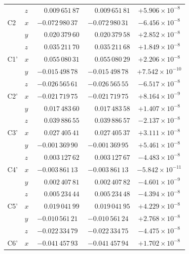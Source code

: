 \begin{longtable}{llccc}
      & $z$ & $\phantom{-}0.009\,651\,87$ & $\phantom{-}0.009\,651\,81$ & $+5.906 \times 10^{-8}$ \\[2pt]
  C2  & $x$ & $-0.072\,980\,37$ & $-0.072\,980\,31$ & $-6.456 \times 10^{-8}$ \\
      & $y$ & $\phantom{-}0.020\,379\,60$ & $\phantom{-}0.020\,379\,58$ & $+2.852 \times 10^{-8}$ \\
      & $z$ & $\phantom{-}0.035\,211\,70$ & $\phantom{-}0.035\,211\,68$ & $+1.849 \times 10^{-8}$ \\[2pt]
  C1' & $x$ & $\phantom{-}0.055\,080\,31$ & $\phantom{-}0.055\,080\,29$ & $+2.206 \times 10^{-8}$ \\
      & $y$ & $-0.015\,498\,78$ & $-0.015\,498\,78$ & $+7.542 \times 10^{-10}$ \\
      & $z$ & $-0.026\,565\,61$ & $-0.026\,565\,55$ & $-6.517 \times 10^{-8}$ \\[2pt]
  C2' & $x$ & $-0.021\,719\,75$ & $-0.021\,719\,75$ & $+8.164 \times 10^{-9}$ \\
      & $y$ & $\phantom{-}0.017\,483\,60$ & $\phantom{-}0.017\,483\,58$ & $+1.407 \times 10^{-8}$ \\
      & $z$ & $\phantom{-}0.039\,886\,55$ & $\phantom{-}0.039\,886\,57$ & $-2.137 \times 10^{-8}$ \\[2pt]
  C3' & $x$ & $\phantom{-}0.027\,405\,41$ & $\phantom{-}0.027\,405\,37$ & $+3.111 \times 10^{-8}$ \\
      & $y$ & $-0.001\,369\,90$ & $-0.001\,369\,95$ & $+5.461 \times 10^{-8}$ \\
      & $z$ & $\phantom{-}0.003\,127\,62$ & $\phantom{-}0.003\,127\,67$ & $-4.483 \times 10^{-8}$ \\[2pt]
  C4' & $x$ & $-0.003\,861\,13$ & $-0.003\,861\,13$ & $-5.842 \times 10^{-11}$ \\
      & $y$ & $\phantom{-}0.002\,407\,81$ & $\phantom{-}0.002\,407\,82$ & $-4.601 \times 10^{-9}$ \\
      & $z$ & $\phantom{-}0.005\,234\,44$ & $\phantom{-}0.005\,234\,48$ & $-4.394 \times 10^{-8}$ \\[2pt]
  C5' & $x$ & $\phantom{-}0.019\,041\,99$ & $\phantom{-}0.019\,041\,95$ & $+4.229 \times 10^{-8}$ \\
      & $y$ & $-0.010\,561\,21$ & $-0.010\,561\,24$ & $+2.768 \times 10^{-8}$ \\
      & $z$ & $-0.022\,334\,79$ & $-0.022\,334\,75$ & $-4.475 \times 10^{-8}$ \\[2pt]
  C6' & $x$ & $-0.041\,457\,93$ & $-0.041\,457\,94$ & $+1.702 \times 10^{-8}$ \\

\end{longtable}
